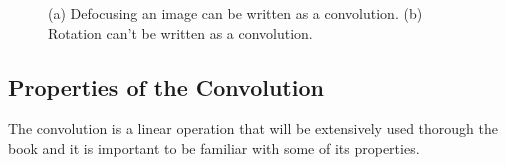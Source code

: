 \begin{figure}[h!]
\centerline{
} 
\caption{(a) Defocusing an image can be written as a convolution. (b) Rotation can't be written as a convolution.}
\label{fig:transformationsquizz2}
\end{figure}





%
%
%
%



\subsection{Properties of the Convolution}\label{sec:linear_image_filtering:properties_of_the_convolution}

The convolution is a linear operation that will be extensively used thorough the book and it is important to be familiar with some of its properties.

